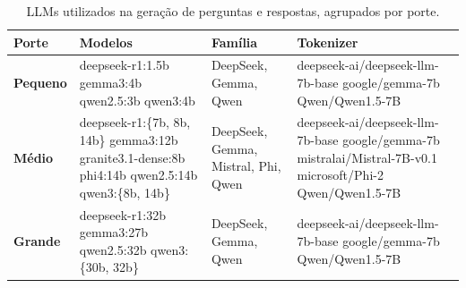 \begin{table}[htbp]
\centering
\caption{LLMs utilizados na geração de perguntas e respostas, agrupados por porte.}
\small
\label{tab:modelos_utilizados_por_porte}
\begin{tabular}{@{}p{3cm}p{4cm}p{4cm}p{4cm}@{}}
\toprule
\textbf{Porte} & \textbf{Modelos} & \textbf{Família} & \textbf{Tokenizer} \\
\midrule
\textbf{Pequeno} &
deepseek-r1:1.5b \newline gemma3:4b \newline qwen2.5:3b \newline qwen3:4b &
DeepSeek, Gemma, Qwen &
deepseek-ai/deepseek-llm-7b-base \newline google/gemma-7b \newline Qwen/Qwen1.5-7B \\
\midrule
\textbf{Médio} &
deepseek-r1:\{7b, 8b, 14b\} \newline gemma3:12b \newline granite3.1-dense:8b \newline phi4:14b \newline qwen2.5:14b \newline qwen3:\{8b, 14b\} &
DeepSeek, Gemma, Mistral, Phi, Qwen &
deepseek-ai/deepseek-llm-7b-base \newline google/gemma-7b \newline mistralai/Mistral-7B-v0.1 \newline microsoft/Phi-2 \newline Qwen/Qwen1.5-7B \\
\midrule
\textbf{Grande} &
deepseek-r1:32b \newline gemma3:27b \newline qwen2.5:32b \newline qwen3:\{30b, 32b\} &
DeepSeek, Gemma, Qwen &
deepseek-ai/deepseek-llm-7b-base \newline google/gemma-7b \newline Qwen/Qwen1.5-7B \\
\bottomrule
\end{tabular}
\end{table}